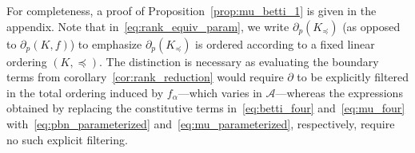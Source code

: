 \documentclass[10pt]{article}
\numberwithin{equation}{section}
\newcommand{\+}{%
	\raisebox{0.18ex}{\scaleobj{0.55}{+}}
}
\theoremstyle{definition}
\newtheorem{remark}{Remark}
\theoremstyle{definition}
\begin{document}
\noindent For completeness, a proof of Proposition~\ref{prop:mu_betti_1} is given in the appendix. 
Note that in~\eqref{eq:rank_equiv_param}, we write $\partial_p(K_{\preceq})$ (as opposed to $\partial_p(K, f)$) to emphasize $\partial_p(K_{\preceq})$ is ordered  according to a fixed linear ordering $(K, \preceq)$. The distinction is necessary as evaluating the boundary terms from corollary~\ref{cor:rank_reduction} would require $\partial$ to be explicitly filtered in the total ordering induced by $f_\alpha$---which varies in $\mathcal{A}$---whereas the expressions obtained by replacing the constitutive terms in~\eqref{eq:betti_four} and~\eqref{eq:mu_four} with~\eqref{eq:pbn_parameterized} and~\eqref{eq:mu_parameterized}, respectively, require no such explicit filtering.  




\end{document}
